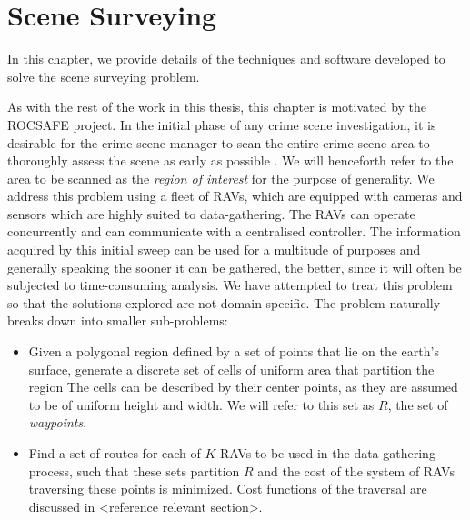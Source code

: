 \chapter{Scene Surveying}\label{chapter:SceneSurveying}
In this chapter, we provide details of the techniques and software developed to solve the scene surveying problem.

As with the rest of the work in this thesis, this chapter is motivated by the ROCSAFE project. In the initial phase of any crime scene investigation, it is desirable for the crime scene manager to scan the entire crime scene area to thoroughly assess the scene as early as possible \cite{TechnicalWorkingGrouponCrimeSceneInvestigation2013CrimeEnforcement}. We will henceforth refer to the area to be scanned as the \textit{region of interest} for the purpose of generality. We address this problem using a fleet of RAVs, which are equipped with cameras and sensors which are highly suited to data-gathering. The RAVs can operate concurrently and can communicate with a centralised controller. The information acquired by this initial sweep can be used for a multitude of purposes and generally speaking the sooner it can be gathered, the better, since it will often be subjected to time-consuming analysis. We have attempted to treat this problem so that the solutions explored are not domain-specific. The problem naturally breaks down into smaller sub-problems:
\begin{itemize}
    \item Given a polygonal region defined by a set of points that lie on the earth's surface, generate a discrete set of cells of uniform area that partition the region 
    The cells can be described by their center points, as they are assumed to be of uniform height and width. We will refer to this set as $R$, the set of \textit{waypoints}.
    \item Find a set of routes for each of $K$ RAVs to be used in the data-gathering process, such that these sets partition $R$ and the cost of the system of RAVs traversing these points is minimized. Cost functions of the traversal are discussed in <reference relevant section>.
\end{itemize}

